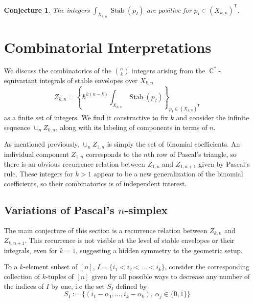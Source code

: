 \documentclass[12 pt]{article}
\theoremstyle{plain}
\theoremstyle{plain}
\theoremstyle{plain}
\theoremstyle{plain}
\theoremstyle{plain}
\theoremstyle{plain}
\theoremstyle{plain}
\theoremstyle{plain}
\theoremstyle{plain}
\newtheorem{conjecture}[theorem]{Conjecture}
\theoremstyle{plain}
\theoremstyle{remark}
\theoremstyle{remark}
\theoremstyle{definition}
\theoremstyle{definition}
\theoremstyle{definition}
\theoremstyle{definition}
\theoremstyle{definition}
\theoremstyle{definition}
\DeclareMathOperator{\C}{\mathbb{C}}
\DeclareMathOperator{\Stab}{Stab}
\newcommand{\bT}{\mathsf{T}}
\begin{document}
\begin{conjecture}\label{positivity}
The integers $\int_{X_{k,n}}\Stab(p_{I})$ are positive for $p_I\in\left(X_{k,n}\right)^{\bT}$.
\end{conjecture}

\section{Combinatorial Interpretations}

We discuss the combinatorics of the ${n\choose k}$ integers arising from the $\C^*$-equivariant integrals of stable envelopes over $X_{k,n}$
\[
Z_{k,n} = \left\{\hbar^{k(n-k)}\int_{X_{k,n}}\Stab(p_I)\right\}_{p_I \in (X_{k,n})^\bT}
\]
as a finite set of integers. We find it constructive to fix $k$ and consider the infinite sequence $\cup_n Z_{k,n}$, along with its labeling of components in terms of $n$.  

As mentioned previously, $\cup_nZ_{1,n}$ is simply the set of binomial coefficients. An individual component $Z_{1,n}$ corresponds to the $n$th row of Pascal's triangle, so there is an obvious recurrence relation between $Z_{1,n}$ and $Z_{1,n+1}$ given by Pascal's rule. These integers for $k>1$ appear to be a new generalization of the binomial coefficients, so their combinatorics is of independent interest. 
\subsection{Variations of Pascal's $n$-simplex}\label{4.1}

The main conjecture of this section is a recurrence relation between $Z_{k,n}$ and $Z_{k,n+1}$. This recurrence is not visible at the level of stable envelopes or their integrals, even for $k=1$, suggesting a hidden symmetry to the geometric setup. 

To a $k$-element subset of $[n]$, $I=\{i_1<i_2<\dots<i_k\}$, consider the corresponding collection of $k$-tuples of $[n]$ given by all possible ways to decrease any number of the indices of $I$ by one, i.e the set $S_{I}$ defined by
\[
S_{I}:=\big\{(i_{1}-\alpha_{1},\dots,i_{k}-\alpha_{k}),\ \alpha_{j}\in\{0,1\}\big\}
\]
\end{document}

